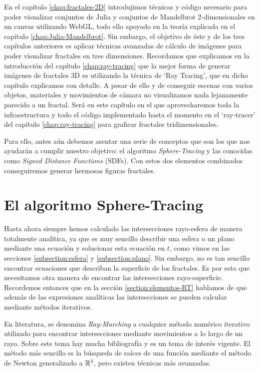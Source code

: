 %
%

En el capítulo \ref{chap:fractales-2D} introdujimos técnicas y código necesario para poder visualizar conjuntos de Julia y conjuntos de Mandelbrot 2-dimensionales en un canvas utilizando WebGL, todo ello apoyado en la teoría explicada en el capítulo \ref{chap:Julia-Mandelbrot}. Sin embargo, el objetivo de éste y de los tres capítulos anteriores es aplicar técnicas avanzadas de cálculo de imágenes para poder visualizar fractales en tres dimensiones. Recordamos que explicamos en la introducción del capítulo \ref{chap:ray-tracing} que la mejor forma de generar imágenes de fractales 3D es utilizando la técnica de `Ray Tracing', que en dicho capítulo explicamos con detalle. A pesar de ello y de conseguir escenas con varios objetos, materiales y movimientos de cámara no visualizamos nada lejanamente parecido a un fractal. Será en este capítulo en el que aprovecharemos toda la infraestructura y todo el código implementado hasta el momento en el `ray-tracer' del capítulo \ref{chap:ray-tracing} para graficar fractales tridimensionales.

Para ello, antes aún debemos asentar una serie de conceptos que son los que nos ayudarán a cumplir nuestro objetivo: el algoritmo \textit{Sphere-Tracing} y las conocidas como \textit{Signed Distance Functions} (SDFs). Con estos dos elementos combinados conseguiremos generar hermosas figuras fractales.

\section{El algoritmo Sphere-Tracing}
\label{section:sphere-tracing}

Hasta ahora siempre hemos calculado las intersecciones rayo-esfera de manera totalmente analítica, ya que es muy sencillo describir una esfera o un plano mediante una ecuación y solucionar esta ecuación en $t$, como vimos en las secciones \ref{subsection:esfera} y \ref{subsection:plano}. Sin embargo, no es tan sencillo encontrar ecuaciones que describan la superficie de los fractales. Es por esto que necesitamos otra manera de encontrar las intersecciones rayo-superficie. Recordemos entonces que en la sección \ref{section:elementos-RT} hablamos de que además de las expresiones analíticas las intersecciones se pueden calcular mediante métodos iterativos. 

En literatura, se denomina \textit{Ray-Marching} a cualquier método numérico iterativo utilizado para encontrar intersecciones mediante movimientos a lo largo de un rayo. Sobre este tema hay mucha bibliografía y es un tema de interés vigente. El método más sencillo es la búsqueda de raíces de una función mediante el método de Newton generalizado a $\mathbb{R}^3$, pero existen técnicas más avanzadas. 

